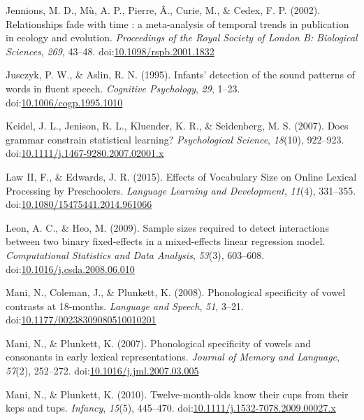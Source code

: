 \documentclass[man]{apa6}
\begin{document}
\leavevmode\hypertarget{ref-Jennions2002}{}%
Jennions, M. D., Mù, A. P., Pierre, Â., Curie, M., \& Cedex, F. P. (2002). Relationships fade with time : a meta-analysis of temporal trends in publication in ecology and evolution. \emph{Proceedings of the Royal Society of London B: Biological Sciences}, \emph{269}, 43--48. doi:\href{https://doi.org/10.1098/rspb.2001.1832}{10.1098/rspb.2001.1832}

\leavevmode\hypertarget{ref-Jusczyk1995}{}%
Jusczyk, P. W., \& Aslin, R. N. (1995). Infants' detection of the sound patterns of words in fluent speech. \emph{Cognitive Psychology}, \emph{29}, 1--23. doi:\href{https://doi.org/10.1006/cogp.1995.1010}{10.1006/cogp.1995.1010}

\leavevmode\hypertarget{ref-Keidel2007}{}%
Keidel, J. L., Jenison, R. L., Kluender, K. R., \& Seidenberg, M. S. (2007). Does grammar constrain statistical learning? \emph{Psychological Science}, \emph{18}(10), 922--923. doi:\href{https://doi.org/10.1111/j.1467-9280.2007.02001.x}{10.1111/j.1467-9280.2007.02001.x}

\leavevmode\hypertarget{ref-Law2015}{}%
Law II, F., \& Edwards, J. R. (2015). Effects of Vocabulary Size on Online Lexical Processing by Preschoolers. \emph{Language Learning and Development}, \emph{11}(4), 331--355. doi:\href{https://doi.org/10.1080/15475441.2014.961066}{10.1080/15475441.2014.961066}

\leavevmode\hypertarget{ref-Leon2009}{}%
Leon, A. C., \& Heo, M. (2009). Sample sizes required to detect interactions between two binary fixed-effects in a mixed-effects linear regression model. \emph{Computational Statistics and Data Analysis}, \emph{53}(3), 603--608. doi:\href{https://doi.org/10.1016/j.csda.2008.06.010}{10.1016/j.csda.2008.06.010}

\leavevmode\hypertarget{ref-Mani2008}{}%
Mani, N., Coleman, J., \& Plunkett, K. (2008). Phonological specificity of vowel contrasts at 18-months. \emph{Language and Speech}, \emph{51}, 3--21. doi:\href{https://doi.org/10.1177/00238309080510010201}{10.1177/00238309080510010201}

\leavevmode\hypertarget{ref-Mani2007}{}%
Mani, N., \& Plunkett, K. (2007). Phonological specificity of vowels and consonants in early lexical representations. \emph{Journal of Memory and Language}, \emph{57}(2), 252--272. doi:\href{https://doi.org/10.1016/j.jml.2007.03.005}{10.1016/j.jml.2007.03.005}

\leavevmode\hypertarget{ref-Mani2010kepstups}{}%
Mani, N., \& Plunkett, K. (2010). Twelve-month-olds know their cups from their keps and tups. \emph{Infancy}, \emph{15}(5), 445--470. doi:\href{https://doi.org/10.1111/j.1532-7078.2009.00027.x}{10.1111/j.1532-7078.2009.00027.x}
\end{document}
